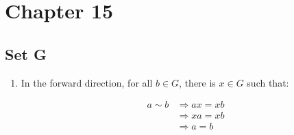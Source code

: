 \section{Chapter 15}
\subsection{Set G}
\begin{enumerate}
    \item In the forward direction, for all $b \in G$, there is $x \in G$ such that:

    \begin{equation}
    \begin{split}
    a \sim b & \Rightarrow ax = xb \\
     & \Rightarrow  xa = xb \\
     & \Rightarrow a = b
    \end{split}
    \end{equation}
    

\end{enumerate}
